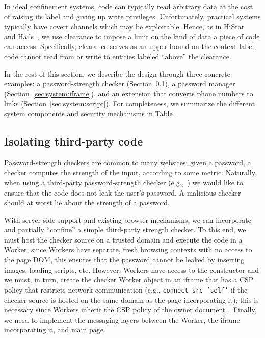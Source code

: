 In ideal confinement systems, code can typically read arbitrary data
at the cost of raising its label and giving up write privileges.
%
Unfortunately, practical systems typically have covert channels which
may be exploitable.
%
Hence, as in HiStar~ and Hails~,
we use clearance to impose a limit on the kind of data a piece of code
can access.
%
Specifically, clearance serves as an upper bound on the context label,
code cannot read from or write to entities labeled ``above'' the
clearance.

In the rest of this section, we describe the \sys{} design through
three concrete examples: a password-strength checker
(Section~\ref{sec:system:worker}), a password manager
(Section~\ref{sec:system:iframe}), and an extension that converts
phone numbers to links (Section~\ref{sec:system:script}).
%
For completeness, we summarize the different system components and
security mechanisms in Table~.



\subsection{Isolating third-party code}
\label{sec:system:worker}

Password-strength checkers are common to many websites;
%
given a password, a checker computes the strength of the input,
according to some metric.
%
Naturally, when using a third-party password-strength checker
(e.g.,~) we would like to ensure that the
code does not leak the user's password.
%
A malicious checker should at worst lie about the strength of a
password.

With server-side support and existing browser mechanisms, we can
incorporate and partially ``confine'' a simple third-party strength
checker.
%
To this end, we must host the checker source on a trusted domain and
execute the code in a Worker; since Workers have separate, fresh
browsing contexts with no access to the page DOM, this ensures that
the password cannot be leaked by inserting images, loading scripts,
etc.
%
However, Workers have access to the \xhr{} constructor and we must, in
turn, create the checker Worker object in an iframe that has a CSP
policy that restricts network communication (e.g., \texttt{connect-src
'self'} if the checker source is hosted on the same domain as the page
incorporating it); this is necessary since Workers inherit the CSP
policy of the owner document~.
%
Finally, we need to implement the messaging layers between the Worker,
the iframe incorporating it, and main page.

